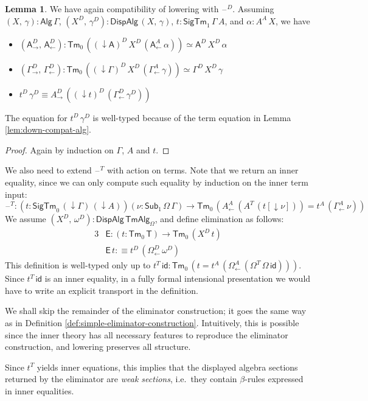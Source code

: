 \documentclass[12pt,a4paper,twoside,openany]{book}
\theoremstyle{remark}
\theoremstyle{definition}
\newtheorem{mylemma}{Lemma}
\theoremstyle{theorem}
\newcommand{\ms}[1]{\mathsf{#1}}
\newcommand{\id}{\mathsf{id}}
\newcommand{\Sub}{\mathsf{Sub}}
\newcommand{\Tm}{\mathsf{Tm}}
\newcommand{\blank}{\mathord{\hspace{1pt}\text{--}\hspace{1pt}}}
\newcommand{\SigTm}{\mathsf{SigTm}}
\newcommand{\A}{\mathsf{A}}
\newcommand{\Alg}{\ms{Alg}}
\newcommand{\DispAlg}{\ms{DispAlg}}
\newcommand{\TmAlg}{\ms{TmAlg}}
\newcommand{\down}{\downarrow}
\newcommand{\defn}{:\equiv}
\begin{document}
\begin{mylemma}
We have again compatibility of lowering with $\blank^D$. Assuming
$(X,\,\gamma) : \Alg\,\Gamma$, $(X^D,\,\gamma^D) : \DispAlg\,(X,\,\gamma)$,
$t : \SigTm_1\,\Gamma\,A$, and $\alpha : A^A\,X$, we have
\begin{itemize}
  \item $(\A^D_{\to},\,\A^D_{\leftarrow}) :
    \Tm_0\,((\down\!\A)^D\,X^D\,(\A^A_{\leftarrow}\,\alpha)) \simeq \A^D\,X^D\,\alpha$
  \item $(\Gamma^D_{\to},\,\Gamma^D_{\leftarrow}) :
    \Tm_0\,((\down\!\Gamma)^D\,X^D\,(\Gamma^A_{\leftarrow}\,\gamma)) \simeq \Gamma^D\,X^D\,\gamma$
  \item $t^D\,\gamma^D \equiv A^D_{\to}\,((\down\!t)^D\,(\Gamma^D_{\leftarrow}\,\gamma^D))$
\end{itemize}
The equation for $t^D\,\gamma^D$ is well-typed because of the term equation in Lemma
\ref{lem:down-compat-alg}.
\end{mylemma}
\begin{proof} Again by induction on $\Gamma$, $A$ and $t$.
\end{proof}

We also need to extend $\blank^T$ with action on terms. Note that we return
an inner equality, since we can only compute such equality by induction on the
inner term input:
\[
\blank^T : (t : \SigTm_0\,(\down\!\Gamma)\,(\down\!A))(\nu : \Sub_1\,\Omega\,\Gamma) \to
  \Tm_0\,(A^A_{\leftarrow}\,(A^T\,(t[\down\!\nu])) = t^A\,(\Gamma^A_{\leftarrow}\,\nu))
\]
We assume $(X^D,\,\omega^D) : \DispAlg\,\TmAlg_\Omega$, and define elimination
as follows:
\begin{alignat*}{3}
  & \ms{E} : (t : \Tm_0\,\ms{T}) \to \Tm_0\,(X^D\,t) \\
  & \ms{E}\,t \defn t^D\,(\Omega^D_{\leftarrow}\,\omega^D)
\end{alignat*}
This definition is well-typed only up to $t^T\,\id : \Tm_0\,(t =
t^A\,(\Omega^A_{\leftarrow}\,(\Omega^T\,\Omega\,\id)))$. Since $t^T\,\id$ is an
inner equality, in a fully formal intensional presentation we would have to
write an explicit transport in the definition.

We shall skip the remainder of the eliminator construction; it goes the same way
as in Definition \ref{def:simple-eliminator-construction}. Intuitively, this is
possible since the inner theory has all necessary features to reproduce the
eliminator construction, and lowering preserves all structure.

Since $t^T$ yields inner equations, this implies that the displayed algebra
sections returned by the eliminator are \emph{weak sections}, i.e.\ they contain
$\beta$-rules expressed in inner equalities.
\end{document}
